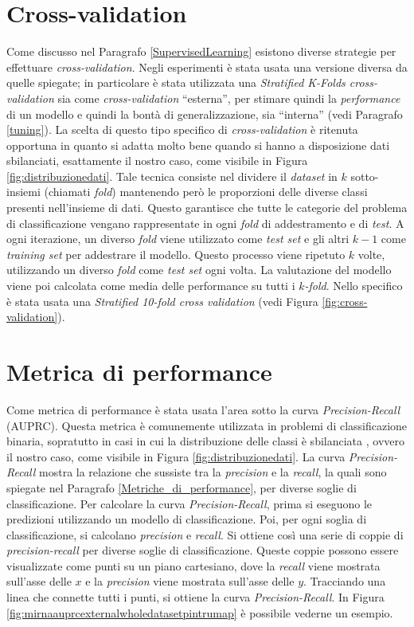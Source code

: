 \documentclass[12pt,italian]{report}
\begin{document}
	\section{Cross-validation}
	\label{cross_validation}
	Come discusso nel Paragrafo \ref{SupervisedLearning} esistono diverse strategie per effettuare \textit{cross-validation}. Negli esperimenti è stata usata una versione diversa da quelle spiegate; in particolare è stata utilizzata una \textit{Stratified K-Folds cross-validation} sia come \textit{cross-validation} ``esterna'', per stimare quindi la \textit{performance} di un modello e quindi la bontà di generalizzazione, sia ``interna'' (vedi Paragrafo \ref{tuning}). La scelta di questo tipo specifico di \textit{cross-validation} è ritenuta opportuna in quanto si adatta molto bene quando si hanno a disposizione dati sbilanciati, esattamente il nostro caso, come visibile in Figura \ref{fig:distribuzionedati}. Tale tecnica consiste nel dividere il \textit{dataset} in $k$ sotto-insiemi (chiamati \textit{fold}) mantenendo però le proporzioni delle diverse classi presenti nell'insieme di dati. Questo garantisce che tutte le categorie del problema di classificazione vengano rappresentate in ogni \textit{fold} di addestramento e di \textit{test}. A ogni iterazione, un diverso \textit{fold} viene utilizzato come \textit{test set} e gli altri $k-1$ come \textit{training set} per addestrare il modello. Questo processo viene ripetuto $k$ volte, utilizzando un diverso \textit{fold} come \textit{test set} ogni volta. La valutazione del modello viene poi calcolata come media delle performance su tutti i $k$\textit{-fold}.
	Nello specifico è stata usata una \textit{Stratified 10-fold cross validation} (vedi Figura \ref{fig:cross-validation}).
	
	
	\section{Metrica di performance}
	\label{metricaAUPRC}
	Come metrica di performance è stata usata l'area sotto la curva \textit{Precision-Recall} (AUPRC). Questa metrica è comunemente utilizzata in problemi di classificazione binaria, sopratutto in casi in cui la distribuzione delle classi è sbilanciata \cite{davis2006relationship}, ovvero il nostro caso, come visibile in Figura \ref{fig:distribuzionedati}.
	La curva \textit{Precision-Recall} mostra la relazione che sussiste tra la \textit{precision} e la \textit{recall}, la quali sono spiegate nel Paragrafo \ref{Metriche_di_performance}, per diverse soglie di classificazione. 
	Per calcolare la curva \textit{Precision-Recall}, prima si eseguono le predizioni utilizzando un modello di classificazione. Poi, per ogni soglia di classificazione, si calcolano \textit{precision} e \textit{recall}. Si ottiene così una serie di coppie di \textit{precision-recall} per diverse soglie di classificazione. Queste coppie possono essere visualizzate come punti su un piano cartesiano, dove la \textit{recall} viene mostrata sull'asse delle $x$ e la \textit{precision} viene mostrata sull'asse delle $y$. Tracciando una linea che connette tutti i punti, si ottiene la curva \textit{Precision-Recall}. In Figura \ref{fig:mirnaauprcexternalwholedatasetpintrumap} è possibile vederne un esempio.
	
\end{document}
